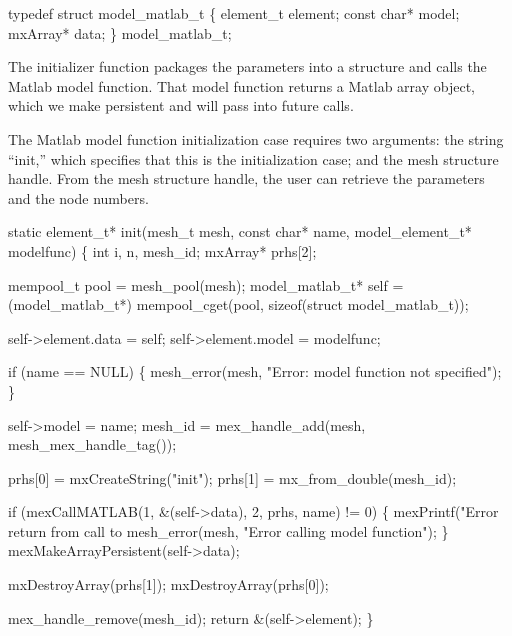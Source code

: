 \nwenddocs{}\endmoddef
typedef struct model_matlab_t \{
    element_t   element;
    const char* model;
    mxArray*    data;
\} model_matlab_t;

\nwendcode{}\nwdocspar

The initializer function packages the parameters into a structure
and calls the Matlab model function.  That model function returns
a Matlab array object, which we make persistent and will pass
into future calls.

The Matlab model function initialization case requires two arguments:
the string ``init,'' which specifies that this is the initialization case;
and the mesh structure handle.  From the mesh structure handle, the
user can retrieve the parameters and the node numbers.

\nwenddocs{}\endmoddef
static element_t* init(mesh_t mesh, const char* name,
                       model_element_t* modelfunc)
\{
    int i, n, mesh_id;
    mxArray* prhs[2];

    mempool_t       pool = mesh_pool(mesh);
    model_matlab_t* self = (model_matlab_t*)
        mempool_cget(pool, sizeof(struct model_matlab_t));

    self->element.data = self;
    self->element.model = modelfunc;

    if (name == NULL) \{
        mesh_error(mesh, "Error: model function not specified");
    \}

    self->model = name;
    mesh_id = mex_handle_add(mesh, mesh_mex_handle_tag());

    prhs[0] = mxCreateString("init");
    prhs[1] = mx_from_double(mesh_id);

    if (mexCallMATLAB(1, &(self->data), 2, prhs, name) != 0) \{
        mexPrintf("Error return from call to %
        mesh_error(mesh, "Error calling model function");
    \}
    mexMakeArrayPersistent(self->data);

    mxDestroyArray(prhs[1]);
    mxDestroyArray(prhs[0]);

    mex_handle_remove(mesh_id);
    return &(self->element);
\}

